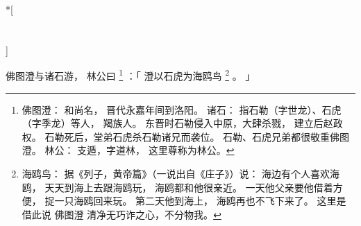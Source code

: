 
\switchcolumn[0]*[\section{}]

佛图澄与诸石游，
林公曰%
\footnote{%
    佛图澄：
        和尚名，
        晋代永嘉年间到洛阳。
    诸石：
        指石勒（字世龙）、石虎（字季龙）等人，
        羯族人。
        东晋时石勒侵入中原，大肆杀戮，
        建立后赵政权。
        石勒死后，堂弟石虎杀石勒诸兄而袭位。
        石勒、石虎兄弟都很敬重佛图澄。
    林公：
        支遁，字道林，
        这里尊称为林公。
}%
：「
    澄以石虎为海鸥鸟%
    \footnote{%
        海鸥鸟：
            据《列子，黄帝篇》（一说出自《庄子》）说：
            海边有个人喜欢海鸥，
            天天到海上去跟海鸥玩，
            海鸥都和他很亲近。
            一天他父亲要他借着方便，
            捉一只海鸥回来玩。
            第二天他到海上，
            海鸥再也不飞下来了。
            这里是借此说
            佛图澄
            清净无巧诈之心，不分物我。
    }%
    。
」

\switchcolumn


